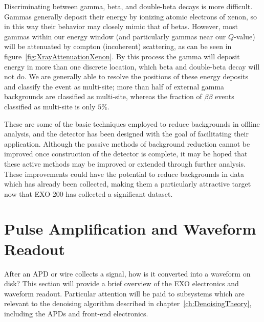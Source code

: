 Discriminating between gamma, beta, and double-beta decays is more difficult.  Gammas generally deposit their energy by ionizing atomic electrons of xenon, so in this way their behavior may closely mimic that of betas.  However, most gammas within our energy window (and particularly gammas near our $Q$-value) will be attenuated by compton (incoherent) scattering, as can be seen in figure~\ref{fig:XrayAttenuationXenon}.  By this process the gamma will deposit energy in more than one discrete location, which beta and double-beta decay will not do.  We are generally able to resolve the positions of these energy deposits and classify the event as multi-site; more than half of external gamma backgrounds are classified as multi-site, whereas the fraction of $\beta\beta$ events classified as multi-site is only $5\%$.~\cite{bb2nEXO2014}

These are some of the basic techniques employed to reduce backgrounds in offline analysis, and the detector has been designed with the goal of facilitating their application.  Although the passive methods of background reduction cannot be improved once construction of the detector is complete, it may be hoped that these active methods may be improved or extended through further analysis.  These improvements could have the potential to reduce backgrounds in data which has already been collected, making them a particularly attractive target now that EXO-200 has collected a significant dataset.

\section{Pulse Amplification and Waveform Readout}\label{sec:DetectorReadout}

After an APD or wire collects a signal, how is it converted into a waveform on disk?  This section will provide a brief overview of the EXO electronics and waveform readout.  Particular attention will be paid to subsystems which are relevant to the denoising algorithm described in chapter~\ref{ch:DenoisingTheory}, including the APDs and front-end electronics.

